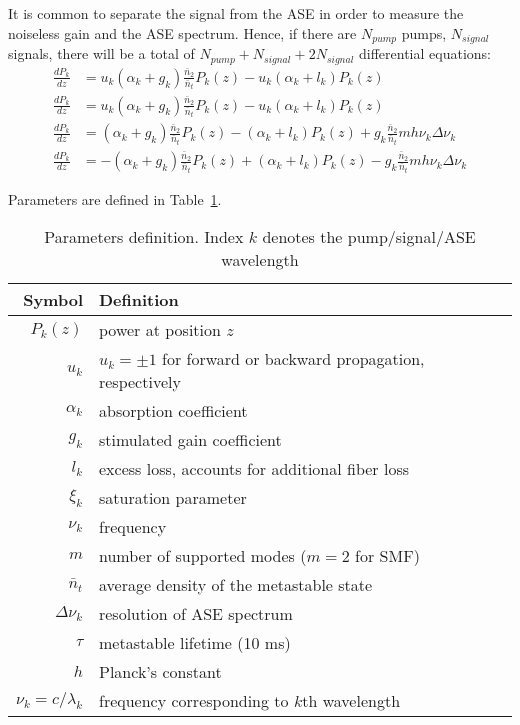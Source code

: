 \documentclass[a4paper]{article}
\begin{document}
It is common to separate the signal from the ASE in order to measure the noiseless gain and the ASE spectrum. Hence, if there are $N_{pump}$ pumps, $N_{signal}$ signals, there will be a total of $N_{pump} + N_{signal} + 2N_{signal}$ differential equations:
\begin{align}\label{eq:odefun}
	\frac{dP_k}{dz} &= u_k(\alpha_k + g_k)\frac{\bar{n}_2}{\bar{n}_t}P_k(z) - u_k(\alpha_k + l_k)P_k(z) \tag{Pump} \\
	\frac{dP_k}{dz} &= u_k(\alpha_k + g_k)\frac{\bar{n}_2}{\bar{n}_t}P_k(z) - u_k(\alpha_k + l_k)P_k(z) \tag{Signal} \\
	\frac{dP_k}{dz} &= (\alpha_k + g_k)\frac{\bar{n}_2}{\bar{n}_t}P_k(z) - (\alpha_k + l_k)P_k(z) + g_k\frac{\bar{n}_2}{\bar{n}_t}mh\nu_k\Delta\nu_k \tag{Forward ASE} \\
	\frac{dP_k}{dz} &= -(\alpha_k + g_k)\frac{\bar{n}_2}{\bar{n}_t}P_k(z) + (\alpha_k + l_k)P_k(z) - g_k\frac{\bar{n}_2}{\bar{n}_t}mh\nu_k\Delta\nu_k \tag{Backward ASE} 
\end{align}

Parameters are defined in Table~\ref{tab:param}.

\begin{table}[t]
	\caption{Parameters definition. Index $k$ denotes the pump/signal/ASE wavelength}
	\label{tab:param}
	\centering
	\begin{tabular}{r|l}
		\hline
		Symbol & Definition \\
		\hline
		$P_k(z)$ & power at position $z$ \\
		$u_k$ & $u_k = \pm1$ for forward or backward propagation, respectively \\
		$\alpha_k$ & absorption coefficient \\
		$g_k$ & stimulated gain coefficient \\
		$l_k$ & excess loss, accounts for additional fiber loss \\
		$\xi_k$ & saturation parameter \\
		$\nu_k$ & frequency \\
		$m$ & number of supported modes ($m = 2$ for SMF)\\
		$\bar{n}_t$ & average density of the metastable state \\
		$\Delta\nu_k$ & resolution of ASE spectrum \\
		$\tau$ & metastable lifetime (10 ms) \\
		$h$ & Planck's constant \\
		$\nu_k = c/\lambda_k$ & frequency corresponding to $k$th wavelength \\
		\hline
	\end{tabular}
\end{table}
\end{document}
